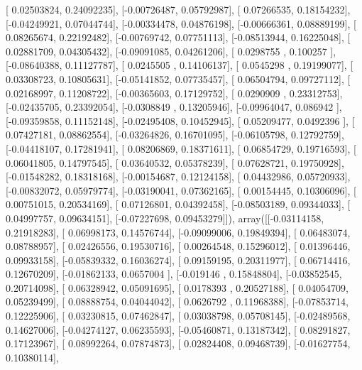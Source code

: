 \documentclass{article}
\begin{document}
       [ 0.02503824,  0.24092235],
       [-0.00726487,  0.05792987],
       [ 0.07266535,  0.18154232],
       [-0.04249921,  0.07044744],
       [-0.00334478,  0.04876198],
       [-0.00666361,  0.08889199],
       [ 0.08265674,  0.22192482],
       [-0.00769742,  0.07751113],
       [-0.08513944,  0.16225048],
       [ 0.02881709,  0.04305432],
       [-0.09091085,  0.04261206],
       [ 0.0298755 ,  0.100257  ],
       [-0.08640388,  0.11127787],
       [ 0.0245505 ,  0.14106137],
       [ 0.0545298 ,  0.19199077],
       [ 0.03308723,  0.10805631],
       [-0.05141852,  0.07735457],
       [ 0.06504794,  0.09727112],
       [ 0.02168997,  0.11208722],
       [-0.00365603,  0.17129752],
       [ 0.0290909 ,  0.23312753],
       [-0.02435705,  0.23392054],
       [-0.0308849 ,  0.13205946],
       [-0.09964047,  0.086942  ],
       [-0.09359858,  0.11152148],
       [-0.02495408,  0.10452945],
       [ 0.05209477,  0.0492396 ],
       [ 0.07427181,  0.08862554],
       [-0.03264826,  0.16701095],
       [-0.06105798,  0.12792759],
       [-0.04418107,  0.17281941],
       [ 0.08206869,  0.18371611],
       [ 0.06854729,  0.19716593],
       [ 0.06041805,  0.14797545],
       [ 0.03640532,  0.05378239],
       [ 0.07628721,  0.19750928],
       [-0.01548282,  0.18318168],
       [-0.00154687,  0.12124158],
       [ 0.04432986,  0.05720933],
       [-0.00832072,  0.05979774],
       [-0.03190041,  0.07362165],
       [ 0.00154445,  0.10306096],
       [ 0.00751015,  0.20534169],
       [ 0.07126801,  0.04392458],
       [-0.08503189,  0.09344033],
       [ 0.04997757,  0.09634151],
       [-0.07227698,  0.09453279]]), array([[-0.03114158,  0.21918283],
       [ 0.06998173,  0.14576744],
       [-0.09099006,  0.19849394],
       [ 0.06483074,  0.08788957],
       [ 0.02426556,  0.19530716],
       [ 0.00264548,  0.15296012],
       [ 0.01396446,  0.09933158],
       [-0.05839332,  0.16036274],
       [ 0.09159195,  0.20311977],
       [ 0.06714416,  0.12670209],
       [-0.01862133,  0.0657004 ],
       [-0.019146  ,  0.15848804],
       [-0.03852545,  0.20714098],
       [ 0.06328942,  0.05091695],
       [ 0.0178393 ,  0.20527188],
       [ 0.04054709,  0.05239499],
       [ 0.08888754,  0.04044042],
       [ 0.0626792 ,  0.11968388],
       [-0.07853714,  0.12225906],
       [ 0.03230815,  0.07462847],
       [ 0.03038798,  0.05708145],
       [-0.02489568,  0.14627006],
       [-0.04274127,  0.06235593],
       [-0.05460871,  0.13187342],
       [ 0.08291827,  0.17123967],
       [ 0.08992264,  0.07874873],
       [ 0.02824408,  0.09468739],
       [-0.01627754,  0.10380114],
\end{document}
